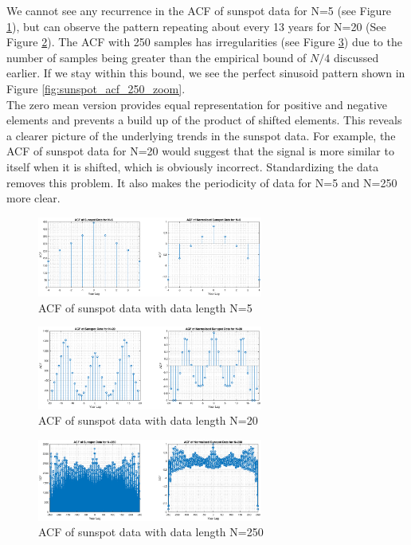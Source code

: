 We cannot see any recurrence in the ACF of sunspot data for N=5 (see Figure \ref{fig:sunspot_acf_5}), but can observe the pattern repeating about every 13 years for N=20 (See Figure \ref{fig:sunspot_acf_20}). The ACF with 250 samples has irregularities (see Figure \ref{fig:sunspot_acf_250}) due to the number of samples being greater than the empirical bound of $N/4$ discussed earlier. If we stay within this bound, we see the perfect sinusoid pattern shown in Figure \ref{fig:sunspot_acf_250_zoom}.\\

The zero mean version provides equal representation for positive and negative elements and prevents a build up of the product of shifted elements. This reveals a clearer picture of the underlying trends in the sunspot data. For example, the ACF of sunspot data for N=20 would suggest that the signal is more similar to itself when it is shifted, which is obviously incorrect. Standardizing the data removes this problem. It also makes the periodicity of data for N=5 and N=250 more clear.


\begin{figure}[h!]
\centering
\includegraphics[width = 0.66\textwidth]{sunspot_acf_5}
\caption{ACF of sunspot data with data length N=5}
\label{fig:sunspot_acf_5}
\end{figure}

\begin{figure}[h!]
\centering
\includegraphics[width = 0.66\textwidth]{sunspot_acf_20}
\caption{ACF of sunspot data with data length N=20}
\label{fig:sunspot_acf_20}
\end{figure}

\begin{figure}[h!]
\centering
\includegraphics[width = 0.66\textwidth]{sunspot_acf_250}
\caption{ACF of sunspot data with data length N=250}
\label{fig:sunspot_acf_250}
\end{figure}


